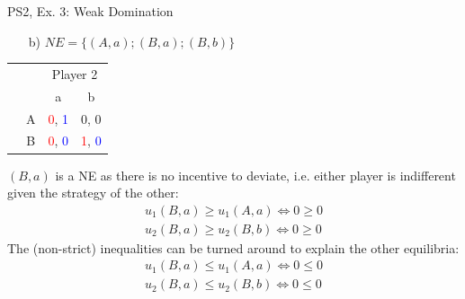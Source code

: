 \begin{frame}{PS2, Ex. 3: Weak Domination}
  \begin{multicols}{2}
    \begin{itemize}
      \item[b)] $NE=\{(A,a);(B,a);(B,b)\}$
    \end{itemize}
    \begin{table}
      \begin{tabular}{cc|c|c|}
        & \multicolumn{1}{c}{} & \multicolumn{2}{c}{\color{blue}Player 2}\\
        \parbox[t]{1mm}{}
        &  &   &  \\
        & A & \textcolor{red}{0}, \textcolor{blue}{1} & 0, 0 \\
        & B & \textcolor{red}{0}, \textcolor{blue}{0} & \textcolor{red}{1}, \textcolor{blue}{0} \\
      \end{tabular}
    \end{table}
    $(B,a)$ is a NE as there is no incentive to deviate, i.e. either player is indifferent given the strategy of the other:
    \begin{align*}
        u_1(B,a)\geq u_1(A,a)\Leftrightarrow0\geq0\\
        u_2(B,a)\geq u_2(B,b)\Leftrightarrow0\geq0
    \end{align*}
    The (non-strict) inequalities can be turned around to explain the other equilibria:
    \begin{align*}
        u_1(B,a)\leq u_1(A,a)\Leftrightarrow0\leq0\\
        u_2(B,a)\leq u_2(B,b)\Leftrightarrow0\leq0
    \end{align*}
    \vfill\null \columnbreak
    \vfill\null
  \end{multicols}
\end{frame}
